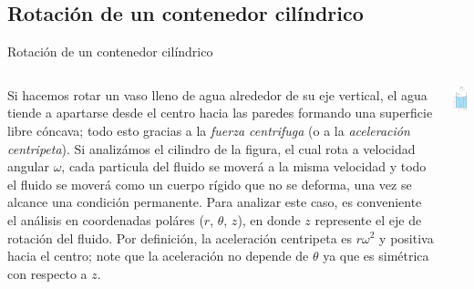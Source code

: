 \documentclass [xcolor=svgnames, t] {beamer}
\begin{document}
\subsection{Rotaci\'on de un contenedor cil\'indrico}
\begin{frame}{Rotaci\'on de un contenedor cil\'indrico}
\vspace{-0.4cm}
\small
\begin{columns}
Si hacemos rotar un vaso lleno de agua alrededor de su eje vertical, el agua tiende a apartarse desde el centro hacia las paredes formando una superficie libre c\'oncava; todo esto gracias a la \emph{fuerza centrifuga} (o a la \emph{aceleraci\'on centripeta}). Si analiz\'amos el cilindro de la figura, el cual rota a velocidad angular $\omega$,  cada particula del fluido se mover\'a a la misma velocidad y todo el fluido se mover\'a como un cuerpo r\'igido que no se deforma, una vez se alcance una condici\'on permanente. Para analizar este caso, es conveniente el an\'alisis en coordenadas pol\'ares ($r$, $\theta$, $z$), en donde $z$ represente el eje de rotaci\'on del fluido. Por definici\'on, la aceleraci\'on centripeta es $r \omega^2$ y positiva hacia el centro; note que la aceleraci\'on no depende de $\theta$ ya que es sim\'etrica con respecto a $z$. 
\vspace{-0.4cm}
\begin{center}
\includegraphics[width=4cm]{cili}
\end{center}
\end{columns}
\end{frame}
\end{document}
